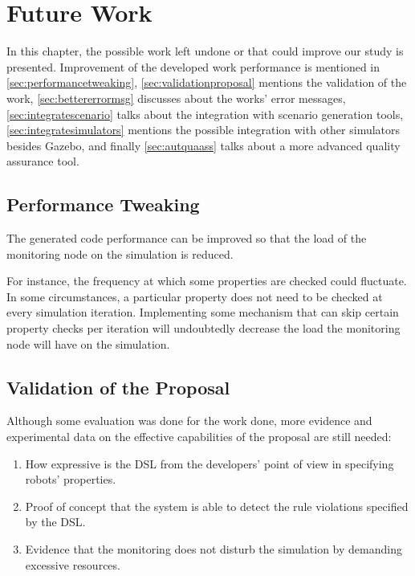 \chapter{Future Work}
\label{chap:futurework}

In this chapter, the possible work left undone or that could improve our study is presented.
Improvement of the developed work performance is mentioned in \autoref{sec:performancetweaking}, \autoref{sec:validationproposal} mentions the validation of the work, \autoref{sec:bettererrormsg} discusses about the works' error messages, \autoref{sec:integratescenario} talks about the integration with scenario generation tools, \autoref{sec:integratesimulators} mentions the possible integration with other simulators besides Gazebo, and finally \autoref{sec:autquaass} talks about a more advanced quality assurance tool.


\section{Performance Tweaking}
\label{sec:performancetweaking}

The generated code performance can be improved so that the load of the monitoring node on the simulation is reduced.

For instance, the frequency at which some properties are checked could fluctuate. In some circumstances, a particular property does not need to be checked at every simulation iteration. Implementing some mechanism that can skip certain property checks per iteration will undoubtedly decrease the load the monitoring node will have on the simulation.


\section{Validation of the Proposal}
\label{sec:validationproposal}

Although some evaluation was done for the work done, more evidence and experimental data on the effective capabilities of the proposal are still needed:

\begin{enumerate}
    \item How expressive is the DSL from the developers' point of view in specifying robots' properties.
    \item Proof of concept that the system is able to detect the rule violations specified by the DSL.
    \item Evidence that the monitoring does not disturb the simulation by demanding excessive resources.
\end{enumerate}


